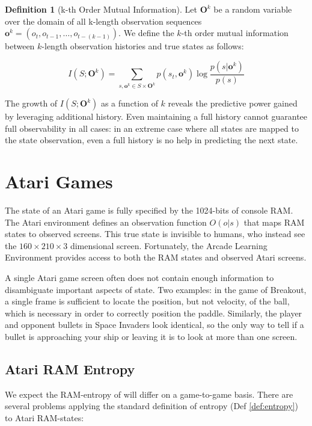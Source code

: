 \documentclass{article} %
\theoremstyle{definition}
\newtheorem{definition}{Definition}[section]
\begin{document}
\begin{definition}[k-th Order Mutual Information]
Let $\textbf{O}^k$ be a random variable over the domain of all
k-length observation sequences $\textbf{o}^k = (o_t, o_{t-1}, \dots,
o_{t-(k-1)})$. We define the $k$-th order mutual information between
$k$-length observation histories and true states as follows:

\[
I(S;\textbf{O}^k) = \sum_{s,\textbf{o}^k \in S \times \textbf{O}^k} p(s_t,\textbf{o}^k) \log \frac{p(s|\textbf{o}^k)}{p(s)}
\]
\end{definition}

The growth of $I(S;\textbf{O}^k)$ as a function of $k$ reveals the
predictive power gained by leveraging additional history. Even
maintaining a full history cannot guarantee full observability in all
cases: in an extreme case where all states are mapped to the state
observation, even a full history is no help in predicting the next
state.

\section{Atari Games}
The state of an Atari game is fully specified by the 1024-bits of
console RAM. The Atari environment defines an observation function
$O(o|s)$ that maps RAM states to observed screens. This true state is
invisible to humans, who instead see the $160 \times 210 \times 3$
dimensional screen. Fortunately, the Arcade Learning Environment
provides access to both the RAM states and observed Atari screens.

A single Atari game screen often does not contain enough information
to disambiguate important aspects of state. Two examples: in the game
of Breakout, a single frame is sufficient to locate the position, but
not velocity, of the ball, which is necessary in order to correctly
position the paddle. Similarly, the player and opponent bullets in
Space Invaders look identical, so the only way to tell if a bullet is
approaching your ship or leaving it is to look at more than one
screen.

\subsection{Atari RAM Entropy}
We expect the RAM-entropy of will differ on a game-to-game
basis. There are several problems applying the standard definition of
entropy (Def \ref{def:entropy}) to Atari RAM-states:
\end{document}
